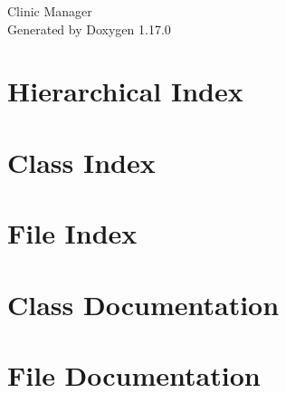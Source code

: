 \documentclass[twoside]{book}
\newcommand{\+}{\discretionary{\mbox{\scriptsize$\hookleftarrow$}}{}{}}
\newcommand{\clearemptydoublepage}{%
    \newpage{\pagestyle{empty}\cleardoublepage}%
  }
\begin{document}
  \raggedbottom
    \hypersetup{pageanchor=false,
                bookmarksnumbered=true,
                pdfencoding=unicode
               }
  \begin{titlepage}
  \vspace*{7cm}
  \begin{center}%
  {\Large Clinic Manager}\\
  \vspace*{1cm}
  {\large Generated by Doxygen 1.17.0}\\
  \end{center}
  \end{titlepage}
  \clearemptydoublepage
  \tableofcontents
  \clearemptydoublepage
  \hypersetup{pageanchor=true}

\chapter{Hierarchical Index}

\chapter{Class Index}

\chapter{File Index}

\chapter{Class Documentation}









\chapter{File Documentation}










  \backmatter
  \newpage
  \clearemptydoublepage
  \printindex
\end{document}
